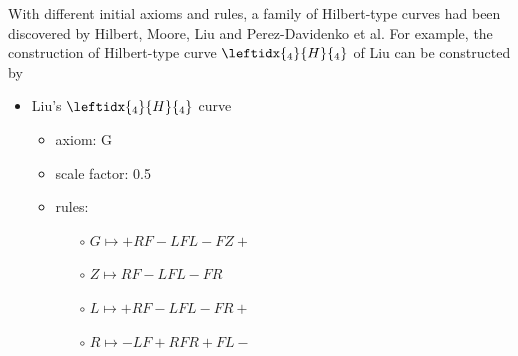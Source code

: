 \documentclass{article}
\begin{document}
With different initial axioms and rules, a family of Hilbert-type curves had been discovered by Hilbert, Moore,
Liu and Perez-Davidenko et al. For example, the construction of Hilbert-type curve $\leftidx{_4}{H}{_4}$ of Liu
can be constructed by

\begin{itemize}
    \label{rule:liu-curve}
    \item Liu's $\leftidx{_4}{H}{_4}$ curve
    \begin{itemize}
      \item axiom: G
      \item scale factor: 0.5
      \item rules: \begin{itemize}
          \item[$\circ$] $G \mapsto +RF-LFL-FZ+ $
          \item[$\circ$] $Z \mapsto RF-LFL-FR $
          \item[$\circ$] $L \mapsto +RF-LFL-FR+ $
          \item[$\circ$] $R \mapsto -LF+RFR+FL- $
      \end{itemize}
    \end{itemize}
\end{itemize}

\end{document}
